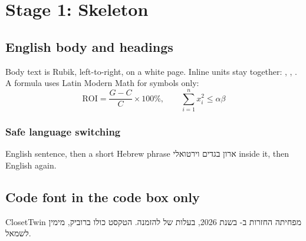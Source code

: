\documentclass{closettwin}
\begin{document}
\mainmatter
\chapter{Stage 1: Skeleton}
\section{English body and headings}
Body text is Rubik, left-to-right, on a white page. Inline units stay together: , , . A formula uses Latin Modern Math for symbols only:
\begin{equation}
\mathrm{ROI}=\frac{G-C}{C}\times 100\%,\qquad \sum_{i=1}^{n} x_i^2 \le \alpha\beta
\end{equation}
\subsection{Safe language switching}
English sentence, then a short Hebrew phrase \foreignlanguage{hebrew}{ארון בגדים וירטואלי} inside it, then English again.
\section{Code font in the code box only}
\begin{hebrewpage}
ClosetTwin מפחיתה החזרות ב- בשנת 2026, בעלות של  להזמנה. הטקסט כולו ברוביק, מימין לשמאל.
\end{hebrewpage}
\end{document}
